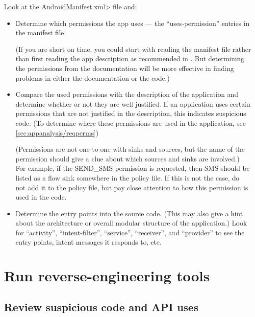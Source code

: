 Look at the \<AndroidManifest.xml> file and:
\begin{itemize}
\item Determine which permissions the app uses --- the ``uses-permission''
  entries in the manifest file.

  (If you are short on time, you could start with reading the manifest file
  rather than first reading the app description as recommended in
  .  But determining the permissions
  from the documentation will be more effective in finding problems in
  either the documentation or the code.)
\item Compare the used permissions with the description of the
  application and determine whether or not they are well justified.
  If an application uses certain permissions that are not justified
  in the description, this indicates suspicious code. 
  (To determine where these permissions are used in the application,
   see \ref{sec:appanalysis/reqperms})

  (Permissions are not one-to-one with sinks and sources, but the name of the permission should give 
  a clue about which sources and sinks are involved.)  For example, if the SEND\_SMS permission is 
  requested, then SMS should be listed as a flow sink somewhere in the policy file.  If this is not the 
  case, do not add it to the policy file, but pay close attention to how this permission is used in the 
  code.

\item Determine the entry points into the source code. (This may also give
  a hint about the architecture or overall modular structure of the
  application.)
  Look for ``activity'', ``intent-filter'', ``service'', ``receiver'', and
  ``provider'' to see the entry points, intent messages it responds to,
  etc.

\end{itemize}



\section{Run reverse-engineering tools\label{sec:reverse-engineering}}



\subsection{Review suspicious code and API uses}
\label{sec:appanalysis/suspicious}

